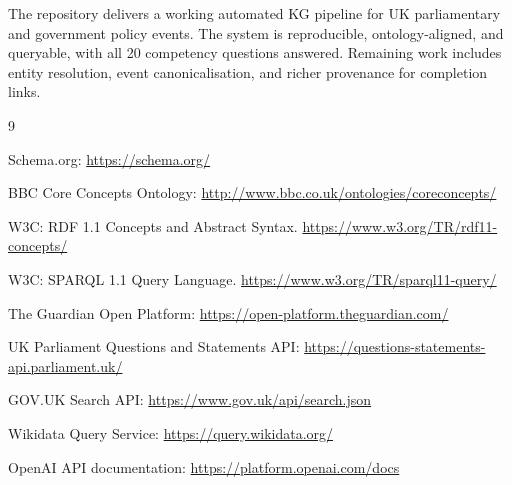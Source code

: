 \documentclass[runningheads]{llncs}
\begin{document}
The repository delivers a working automated KG pipeline for UK parliamentary and
government policy events. The system is reproducible, ontology-aligned, and queryable,
with all 20 competency questions answered. Remaining work includes entity resolution,
event canonicalisation, and richer provenance for completion links.

\newpage
\begin{thebibliography}{9}

Schema.org: \url{https://schema.org/}

BBC Core Concepts Ontology: \url{http://www.bbc.co.uk/ontologies/coreconcepts/}

W3C: RDF 1.1 Concepts and Abstract Syntax. \url{https://www.w3.org/TR/rdf11-concepts/}

W3C: SPARQL 1.1 Query Language. \url{https://www.w3.org/TR/sparql11-query/}

The Guardian Open Platform: \url{https://open-platform.theguardian.com/}

UK Parliament Questions and Statements API: \url{https://questions-statements-api.parliament.uk/}

GOV.UK Search API: \url{https://www.gov.uk/api/search.json}

Wikidata Query Service: \url{https://query.wikidata.org/}

OpenAI API documentation: \url{https://platform.openai.com/docs}

\end{thebibliography}
\end{document}
